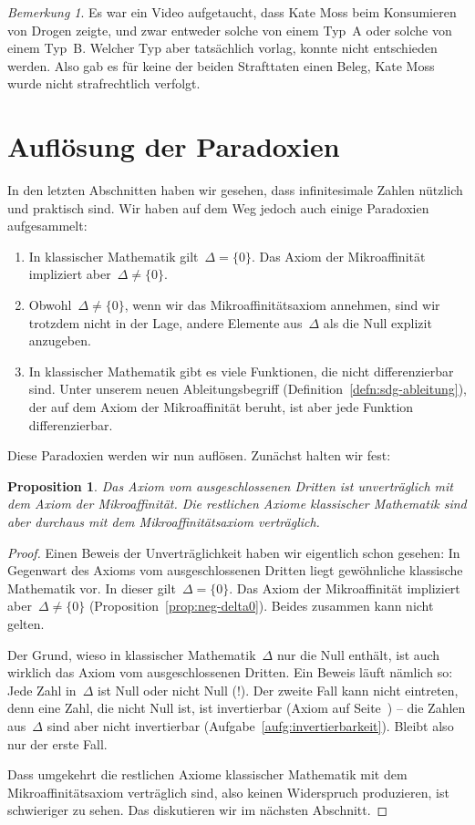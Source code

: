 \documentclass[twoside]{../zirkelblatt}
\theoremstyle{definition}
\theoremstyle{plain}
\newtheorem{prop}[defn]{Proposition}
\theoremstyle{remark}
\newtheorem{bem}[defn]{Bemerkung}
\begin{document}
\begin{bem}
Es war ein Video aufgetaucht, dass Kate Moss beim Konsumieren von Drogen zeigte,
und zwar entweder solche von einem Typ~A oder solche von einem Typ~B. Welcher
Typ aber tatsächlich vorlag, konnte nicht entschieden werden. Also gab es für
keine der beiden Strafttaten einen Beleg, Kate Moss wurde nicht
strafrechtlich verfolgt.
\end{bem}


\section{Auflösung der Paradoxien}

In den letzten Abschnitten haben wir gesehen, dass infinitesimale Zahlen
nützlich und praktisch sind. Wir haben auf dem Weg jedoch auch einige
Paradoxien aufgesammelt:
\begin{enumerate}
\item[1.] In klassischer Mathematik gilt~$\Delta = \{0\}$. Das Axiom der
Mikroaffinität impliziert aber~$\Delta \neq \{0\}$.
\item[2.] Obwohl~$\Delta \neq \{0\}$, wenn wir das Mikroaffinitätsaxiom annehmen,
sind wir trotzdem nicht in der Lage, andere Elemente aus~$\Delta$ als die Null
explizit anzugeben.
\item[3.] In klassischer Mathematik gibt es viele Funktionen, die nicht
differenzierbar sind. Unter unserem neuen Ableitungsbegriff
(Definition~\ref{defn:sdg-ableitung}), der auf dem Axiom
der Mikroaffinität beruht, ist aber jede Funktion differenzierbar.
\end{enumerate}

Diese Paradoxien werden wir nun auflösen. Zunächst halten wir fest:

\begin{prop}Das Axiom vom ausgeschlossenen Dritten ist unverträglich mit dem
Axiom der Mikroaffinität. Die restlichen Axiome klassischer Mathematik
sind aber durchaus mit dem Mikroaffinitätsaxiom verträglich.\end{prop}
\begin{proof}Einen Beweis der Unverträglichkeit haben wir eigentlich schon
gesehen: In Gegenwart des Axioms vom ausgeschlossenen Dritten liegt gewöhnliche
klassische Mathematik vor. In dieser gilt~$\Delta = \{0\}$. Das Axiom der
Mikroaffinität impliziert aber~$\Delta \neq \{0\}$
(Proposition~\ref{prop:neg-delta0}). Beides zusammen kann nicht gelten.

Der Grund, wieso in klassischer Mathematik~$\Delta$ nur die Null enthält, ist
auch wirklich das Axiom vom ausgeschlossenen Dritten. Ein Beweis läuft nämlich
so: Jede Zahl in~$\Delta$ ist Null oder nicht Null (!). Der zweite Fall kann
nicht eintreten, denn eine Zahl, die nicht Null ist, ist invertierbar (Axiom
auf Seite~\pageref{ax:nichtnullinv}) -- die Zahlen aus~$\Delta$ sind aber nicht
invertierbar (Aufgabe~\ref{aufg:invertierbarkeit}). Bleibt also nur der erste
Fall.

Dass umgekehrt die restlichen Axiome klassischer Mathematik mit dem
Mikroaffinitätsaxiom verträglich sind, also keinen Widerspruch produzieren, ist
schwieriger zu sehen. Das diskutieren wir im nächsten Abschnitt.
\end{proof}
\end{document}
